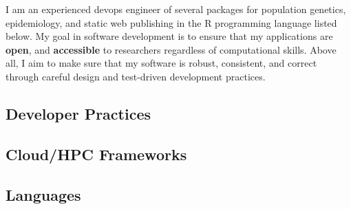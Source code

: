 
I am an experienced devops engineer of several packages for population
genetics, epidemiology, and static web publishing in the R programming language
listed below. My goal in software development is to ensure that my applications
are \textbf{open}, and \textbf{accessible} to researchers regardless of
computational skills. Above all, I aim to make sure that my software is robust,
consistent, and correct through careful design and test-driven development
practices.

\subsection{Developer Practices}


\subsection{Cloud/HPC Frameworks}


\subsection{Languages}


